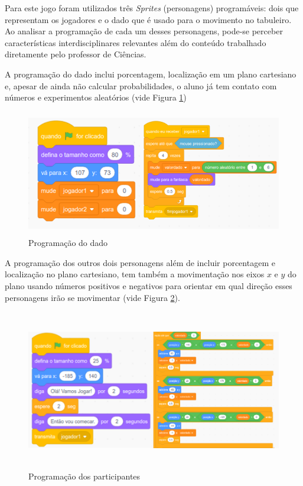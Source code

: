 \documentclass[12pt, openright, a4paper, brazil, english, french, spanish, bibjustif, openany, oneside]{abntex2}
\begin{document}
Para este jogo foram utilizados três \textit{Sprites} (personagens) programáveis: dois que representam os jogadores e o dado que é usado para o movimento no tabuleiro. Ao analisar a programação de cada um desses personagens, pode-se perceber características interdisciplinares relevantes além do conteúdo trabalhado diretamente pelo professor de Ciências.

A programação do dado inclui porcentagem, localização em um plano cartesiano e, apesar de ainda não calcular probabilidades, o aluno já tem contato com números e experimentos aleatórios (vide Figura \ref{dado})

\begin{figure}[H]

 \centering
 
     \caption{Programação do dado \label{dado}}
     \includegraphics[height=5.5cm]{dadofinal.png}
       
    
\end{figure}

A programação dos outros dois personagens além de incluir porcentagem e localização no plano cartesiano, tem também a movimentação nos eixos $x$ e $y$ do plano usando números positivos e negativos para orientar em qual direção esses personagens irão se movimentar (vide Figura \ref{progtab}).

\begin{figure}[H]

 \centering
 
     \caption{Programação dos participantes \label{progtab}}
     \includegraphics[height=7cm]{progtabfinal.png}
       
    
\end{figure}
\end{document}
